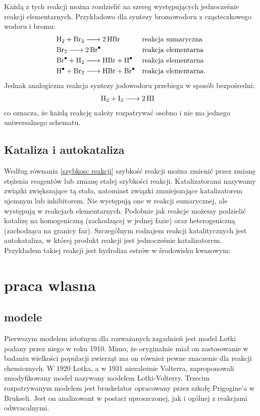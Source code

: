 \documentclass[10pt, a4paper, twoside, onecolumn]{article}
\numberwithin{equation}{section}
\begin{document}
	Każdą z tych reakcji można rozdzielić na szereg występujących jednocześnie reakcji elementarnych. Przykładowo dla syntezy bromowodoru z cząsteczkowego wodoru i bromu:
	\begin{align*}
		&\ce{H2 + Br2 -> 2HBr} &&\text{reakcja sumaryczna} \\
		&\ce{Br2 -> 2Br^{.}} &&\text{reakcja elementarna} \\
		&\ce{Br^{.} + H2 -> HBr + H^{.}} &&\text{reakcja elementarna} \\
		&\ce{H^{.} + Br2 -> HBr + Br^{.}} &&\text{reakcja elementarna}.
	\end{align*}
	Jednak analogiczna reakcja syntezy jodowodoru przebiega w sposób bezpośredni: 
	\begin{align*}
		&\ce{H2 + I2 -> 2HI}
	\end{align*}
	co oznacza, że każdą reakcję należy rozpatrywać osobno i nie ma jednego uniwersalnego schematu. \cite{pigon1}
	
	\subsection{Kataliza i autokataliza}
	Według równania \eqref{szybkosc reakcji} szybkość reakcji można zmienić przez zmianę stężenia reagentów lub zmianę stałej szybkości reakcji. Katalizatorami nazywamy związki zwiększające tą stała, natomiast związki zmniejszające katalizatorem ujemnym lub inhibitorem. Nie występują one w reakcji sumarycznej, ale występują w reakcjach elementarnych. Podobnie jak reakcje możemy podzielić katalizę na homogeniczną (zachodzącej w jednej fazie) oraz heterogeniczną (zachodząca na granicy faz). Szczególnym rodzajem reakcji katalitycznych jest autokataliza, w której produkt reakcji jest jednocześnie katalizatorem. Przykładem takiej reakcji jest hydroliza estrów w środowisku kwasowym: \cite{pigon1}
	\begin{center}
	\end{center}
	
	\section{praca wlasna}
	\subsection{modele}
	Pierwszym modelem istotnym dla rozważanych zagadnień jest model Lotki podany przez niego w roku 1910. Mimo, że oryginalnie miał on zastosowanie w badaniu wielkości populacji zwierząt ma on również pewne znaczenie dla reakcji chemicznych. W 1920 Lotka, a w 1931 niezależnie Volterra, zaproponowali zmodyfikowany model nazywany modelem Lotki-Volterry. Trzecim rozpatrywanym modelem jest bruskelator opracowany przez szkołę Prigogine'a w Brukseli. Jest on analizowant w postaci uproszczonej, jak i ogólnej z reakcjami odwracalnymi. 
\end{document}
